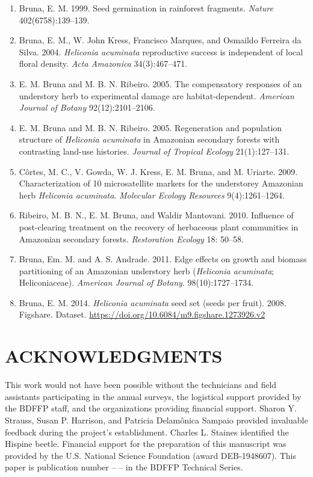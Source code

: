 \documentclass[
  12pt,
  man, donotrepeattitle]{apa6}
\begin{document}
\begin{enumerate}
\def\labelenumi{\arabic{enumi}.}
\item
  Bruna, E. M. 1999. Seed germination in rainforest fragments. \emph{Nature} 402(6758):139--139.
\item
  Bruna, E. M., W. John Kress, Francisco Marques, and Osmaildo Ferreira da Silva. 2004. \emph{Heliconia acuminata} reproductive success is independent of local floral density. \emph{Acta Amazonica} 34(3):467--471.
\item
  E. M. Bruna and M. B. N. Ribeiro. 2005. The compensatory responses of an understory herb to experimental damage are habitat‐dependent. \emph{American Journal of Botany} 92(12):2101--2106.
\item
  E. M. Bruna and M. B. N. Ribeiro. 2005. Regeneration and population structure of \emph{Heliconia acuminata} in Amazonian secondary forests with contrasting land-use histories. \emph{Journal of Tropical Ecology} 21(1):127--131.
\item
  Côrtes, M. C., V. Gowda, W. J. Kress, E. M. Bruna, and M. Uriarte. 2009. Characterization of 10 microsatellite markers for the understorey Amazonian herb \emph{Heliconia acuminata}. \emph{Molecular Ecology Resources} 9(4):1261--1264.
\item
  Ribeiro, M. B. N., E. M. Bruna, and Waldir Mantovani. 2010. Influence of post-clearing treatment on the recovery of herbaceous plant communities in Amazonian secondary forests. \emph{Restoration Ecology} 18: 50--58.
\item
  Bruna, Em. M. and A. S. Andrade. 2011. Edge effects on growth and biomass partitioning of an Amazonian understory herb (\emph{Heliconia acuminata}; Heliconiaceae). \emph{American Journal of Botany}. 98(10):1727--1734.
\item
  Bruna, E. M. 2014. \emph{Heliconia acuminata} seed set (seeds per fruit). 2008. Figshare. Dataset. \url{https://doi.org/10.6084/m9.figshare.1273926.v2}
\end{enumerate}

\hypertarget{acknowledgments}{%
\section{ACKNOWLEDGMENTS}\label{acknowledgments}}

\noindent  
This work would not have been possible without the technicians and field assistants participating in the annual surveys, the logistical support provided by the BDFFP staff, and the organizations providing financial support. Sharon Y. Strauss, Susan P. Harrison, and Patricia Delamônica Sampaio provided invaluable feedback during the project's establishment. Charles L. Staines identified the Hispine beetle. Financial support for the preparation of this manuscript was provided by the U.S. National Science Foundation (award DEB-1948607). This paper is publication number -- -- in the BDFFP Technical Series.
\end{document}
